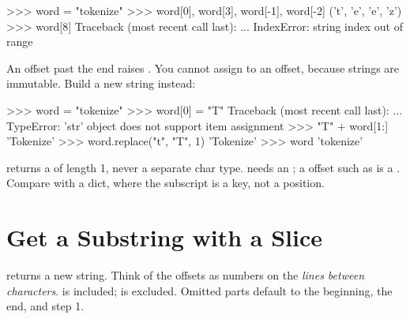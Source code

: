 \begin{center}
\end{center}

\begin{pycode}
>>> word = "tokenize"
>>> word[0], word[3], word[-1], word[-2]
('t', 'e', 'e', 'z')
>>> word[8]
Traceback (most recent call last):
  ...
IndexError: string index out of range
\end{pycode}

An offset past the end raises . You cannot assign to an offset, because strings are immutable.
Build a new string instead:

\begin{pycode}
>>> word = "tokenize"
>>> word[0] = "T"
Traceback (most recent call last):
  ...
TypeError: 'str' object does not support item assignment
>>> "T" + word[1:]
'Tokenize'
>>> word.replace("t", "T", 1)
'Tokenize'
>>> word
'tokenize'
\end{pycode}

\begin{typecheck}
 returns a  of length 1, never a separate char type.  needs an
; a  offset such as  is a . Compare with a dict, where the subscript
is a key, not a position.
\end{typecheck}

\section{Get a Substring with a Slice}

 returns a new string. Think of the offsets as numbers on the
\emph{lines between characters}.  is included;  is excluded. Omitted parts
default to the beginning, the end, and step 1.

